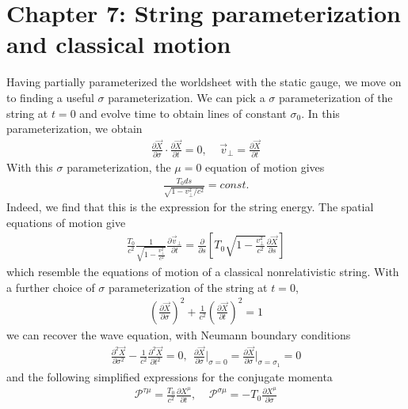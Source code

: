 \documentclass[11pt]{article}
\begin{document}
\section*{Chapter 7: String parameterization and classical motion}
Having partially parameterized the worldsheet with the static gauge, we move on to finding a useful $\sigma$ parameterization. We can pick a $\sigma$ parameterization of the string at $t = 0$ and evolve time to obtain lines of constant $\sigma_0$. In this parameterization, we obtain 
\begin{align*}
    \frac{\partial \vec{X}}{\partial \sigma} \cdot \frac{\partial \vec{X}}{\partial t} = 0, ~~~~~ \vec{v}_\perp = \frac{\partial \vec{X}}{\partial t} \tag{7.1}
\end{align*}
With this $\sigma$ parameterization, the $\mu= 0$ equation of motion gives 
\begin{align*}
    \frac{T_0 ds }{\sqrt{1 - v_\perp^2/ c^2}} = const.  \tag{7.8}
\end{align*}
Indeed, we find that this is the expression for the string energy. The spatial equations of motion give 
\begin{align*}
    \frac{T_0}{c^2} \frac{1}{\sqrt{1 - \frac{v_\perp^2}{c^2}}} \frac{\partial \vec{v}_\perp}{\partial t} = \frac{\partial }{\partial s} \left[T_0 \sqrt{1 - \frac{v_\perp^2}{c^2}} \frac{\partial \vec{X}}{\partial s} \right]  \tag{7.15, 7.14}
\end{align*} 
which resemble the equations of motion of a classical nonrelativistic string. With a further choice of $\sigma$ parameterization of the string at $t=0$, 
\begin{align*}
    \left( \frac{\partial \vec{X}}{\partial \sigma} \right)^2 + \frac{1}{c^2}\left( \frac{\partial \vec{X}}{\partial t}\right)^2 = 1 \tag{7.28}
\end{align*}
we can recover the wave equation, with Neumann boundary conditions
\begin{align*}
    \frac{\partial^2 \vec{X}}{\partial \sigma^2} - \frac{1}{c^2}\frac{\partial^2 \vec{X}}{\partial t^2}= 0, ~~ \frac{\partial \vec{X}}{\partial \sigma} \bigg|_{\sigma = 0} = \frac{\partial \vec{X}}{\partial \sigma} \bigg|_{\sigma = \sigma_1} = 0 \tag{7.26, 7.29}
\end{align*}
and the following simplified expressions for the conjugate momenta 
\begin{align*}
    \mathcal{P}^{\tau \mu} = \frac{T_0}{c^2} \frac{\partial X^\mu}{\partial t}, ~~~~~ \mathcal{P}^{\sigma \mu} = - T_0 \frac{\partial X^\mu }{\partial \sigma} \tag{7.31, 7.32}
\end{align*}
\end{document}
